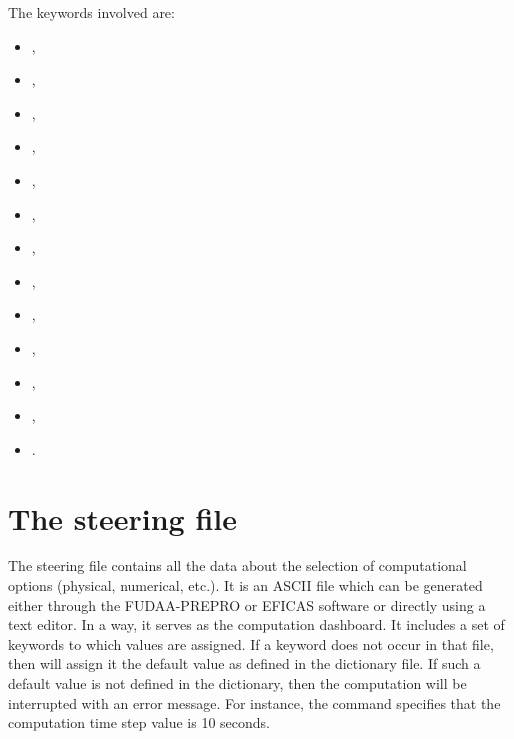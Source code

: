 The keywords involved are:

\begin{itemize}
\item {},

\item {},

\item {},

\item {},

\item {},

\item {},

\item {},

\item {},

\item {},

\item {},

\item {},

\item {},

\item {}.
\end{itemize}

\section{The steering file}

The steering file contains all the data about the selection of computational
options (physical, numerical, etc.). It is an ASCII file which can be generated
either through the FUDAA-PREPRO or EFICAS software or directly using a text
editor. In a way, it serves as the computation dashboard. It includes a set of
keywords to which values are assigned. If a keyword does not occur in that
file, then  will assign it the default value as defined in the
dictionary file. If such a default value is not defined in the dictionary, then
the computation will be interrupted with an error message. For instance, the
command  specifies that the computation time step
value is 10 seconds.

